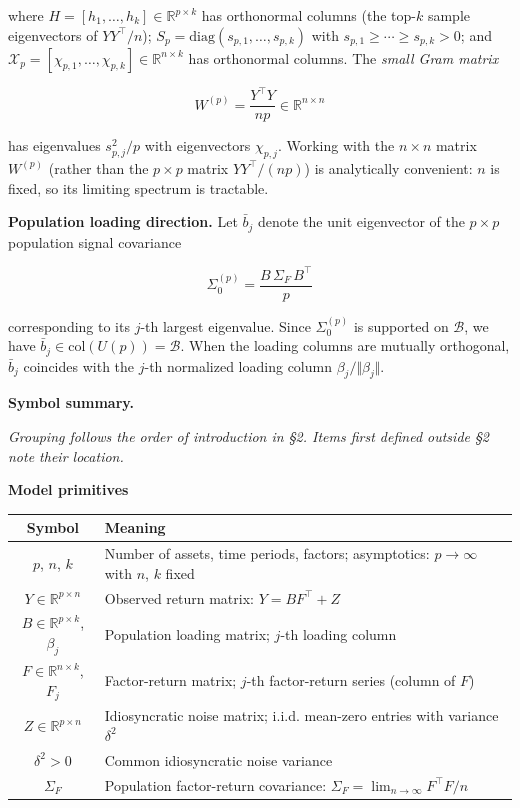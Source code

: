 \documentclass{article}
\theoremstyle{remark}
\begin{document}
where $H = [h_1,\ldots,h_k]\in\mathbb{R}^{p\times k}$ has orthonormal columns (the top-$k$ sample eigenvectors of $YY^\top/n$); $S_p = \mathrm{diag}(s_{p,1},\ldots,s_{p,k})$ with $s_{p,1}\ge\cdots\ge s_{p,k}>0$; and $\mathcal{X}_p = [\chi_{p,1},\ldots,\chi_{p,k}]\in\mathbb{R}^{n\times k}$ has orthonormal columns. The \textit{small Gram matrix}

\[
W^{(p)} = \frac{Y^\top Y}{np} \in \mathbb{R}^{n\times n}
\]

has eigenvalues $s_{p,j}^2/p$ with eigenvectors $\chi_{p,j}$. Working with the $n\times n$ matrix $W^{(p)}$ (rather than the $p\times p$ matrix $YY^\top/(np)$) is analytically convenient: $n$ is fixed, so its limiting spectrum is tractable.

\textbf{Population loading direction.} Let $\bar{b}_j$ denote the unit eigenvector of the $p\times p$ population signal covariance

\[
\Sigma_0^{(p)} = \frac{B\,\Sigma_F\,B^\top}{p}
\]

corresponding to its $j$-th largest eigenvalue. Since $\Sigma_0^{(p)}$ is supported on $\mathcal{B}$, we have $\bar{b}_j\in\mathrm{col}(U(p)) = \mathcal{B}$. When the loading columns are mutually orthogonal, $\bar{b}_j$ coincides with the $j$-th normalized loading column $\beta_j/\Vert \beta_j\Vert $.

\textbf{Symbol summary.}

\textit{Grouping follows the order of introduction in §2. Items first defined outside §2 note their location.}

\textbf{Model primitives}

\begin{center}
\begin{tabular}{|c|l|}
\hline
Symbol & Meaning \\
\hline
$p$, $n$, $k$ & Number of assets, time periods, factors; asymptotics: $p\to\infty$ with $n$, $k$ fixed \\
\hline
$Y \in \mathbb{R}^{p\times n}$ & Observed return matrix: $Y = BF^\top + Z$ \\
\hline
$B \in \mathbb{R}^{p\times k}$, $\beta_j$ & Population loading matrix; $j$-th loading column \\
\hline
$F \in \mathbb{R}^{n\times k}$, $F_j$ & Factor-return matrix; $j$-th factor-return series (column of $F$) \\
\hline
$Z \in \mathbb{R}^{p\times n}$ & Idiosyncratic noise matrix; i.i.d. mean-zero entries with variance $\delta^2$ \\
\hline
$\delta^2 > 0$ & Common idiosyncratic noise variance \\
\hline
$\Sigma_F$ & Population factor-return covariance: $\Sigma_F = \lim_{n\to\infty} F^\top F/n$ \\
\hline
\end{tabular}
\end{center}
\end{document}

